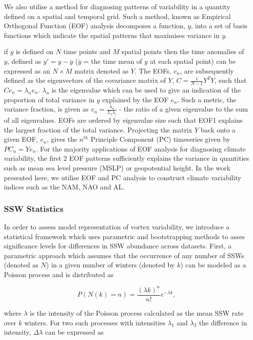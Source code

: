 We also utilise a method for diagnosing patterns of variability in a quantity defined on a spatial and temporal grid. Such a method, known as Empirical Orthogonal Function (EOF) analysis decomposes a function, $y$, into a set of basis functions which indicate the spatial patterns that maximises variance in $y$. 

if $y$ is defined on $N$ time points and $M$ spatial points then the time anomalies of $y$, defined as $y' = y - \overline{y}$ ($\overline{y}$ = the time mean of $y$ at each spatial point) can be expressed as an $N \times M$ matrix denoted as $Y$. The EOFs, $e_n$, are subsequently defined as the eigenvectors of the covariance matrix of $Y$, $C = \frac{1}{N-1}Y^TY$, such that $C e_n = \lambda_n e_n$. $\lambda_n$ is the eigenvalue which can be used to give an indication of the proportion of total variance in $y$ explained by the EOF $e_n$. Such a metric, the variance fraction, is given as $v_n = \frac{\lambda_n}{\Sigma_i \lambda_i}$ - the ratio of a given eigenvalue to the sum of all eigenvalues. EOFs are ordered by eigenvalue size such that EOF1 explains the largest fraction of the total variance. Projecting the matrix $Y$ back onto a given EOF, $e_n$, gives the $n^{th}$ Principle Component (PC) timeseries given by $PC_n = Y e_n$. For the majority applications of EOF analysis for diagnosing climate variability, the first 2 EOF patterns sufficiently explains the variance in quantities such as mean sea level pressure (MSLP) or geopotential height. In the work presented here, we utilise EOF and PC analysis to construct climate variability indices such as the NAM, NAO and AL.  

\subsubsection*{SSW Statistics}
In order to assess model representation of vortex variability, we introduce a statistical framework which uses parametric and bootstrapping methods to asses significance levels for differences in SSW abundance across datasets. First, a parametric approach which assumes that the occurrence of any number of SSWs (denoted as $N$) in a given number of winters (denoted by $k$) can be modeled as a Poisson process and is distributed as 

\begin{equation} \label{Poisson}
P(N(k) = n) = \frac{(\lambda k)^n}{n!} e^{-\lambda k},
\end{equation}

where $\lambda$ is the intensity of the Poisson process calculated as the mean SSW rate over $k$ winters. For two such processes with intensities $\lambda_1$ and $\lambda_2$ the difference in intensity, $\Delta\lambda$ can be expressed as

